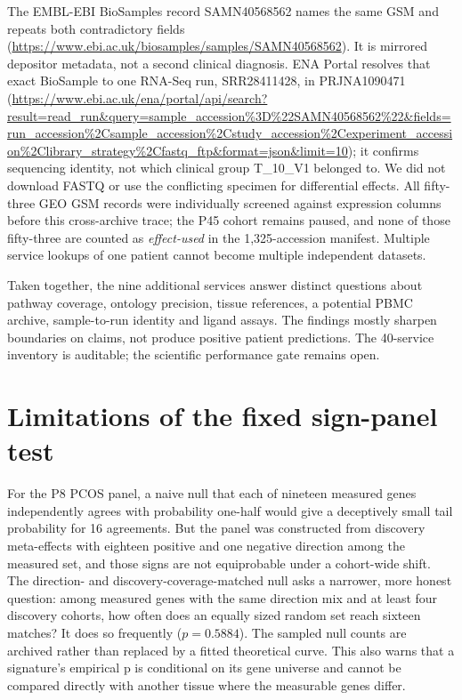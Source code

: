 \documentclass[11pt,a4paper]{article}
\begin{document}
The EMBL-EBI BioSamples record SAMN40568562 names the same GSM and repeats both contradictory fields (\url{https://www.ebi.ac.uk/biosamples/samples/SAMN40568562}). It is mirrored depositor metadata, not a second clinical diagnosis. ENA Portal resolves that exact BioSample to one RNA-Seq run, SRR28411428, in PRJNA1090471 (\url{https://www.ebi.ac.uk/ena/portal/api/search?result=read_run&query=sample_accession%3D%22SAMN40568562%22&fields=run_accession%2Csample_accession%2Cstudy_accession%2Cexperiment_accession%2Clibrary_strategy%2Cfastq_ftp&format=json&limit=10}); it confirms sequencing identity, not which clinical group T\_10\_V1 belonged to. We did not download FASTQ or use the conflicting specimen for differential effects. All fifty-three GEO GSM records were individually screened against expression columns before this cross-archive trace; the P45 cohort remains paused, and none of those fifty-three are counted as \emph{effect-used} in the 1,325-accession manifest. Multiple service lookups of one patient cannot become multiple independent datasets.

Taken together, the nine additional services answer distinct questions about pathway coverage, ontology precision, tissue references, a potential PBMC archive, sample-to-run identity and ligand assays. The findings mostly sharpen boundaries on claims, not produce positive patient predictions. The 40-service inventory is auditable; the scientific performance gate remains open.


\section{Limitations of the fixed sign-panel test}
For the P8 PCOS panel, a naive null that each of nineteen measured genes independently agrees with probability one-half would give a deceptively small tail probability for 16 agreements. But the panel was constructed from discovery meta-effects with eighteen positive and one negative direction among the measured set, and those signs are not equiprobable under a cohort-wide shift. The direction- and discovery-coverage-matched null asks a narrower, more honest question: among measured genes with the same direction mix and at least four discovery cohorts, how often does an equally sized random set reach sixteen matches? It does so frequently ($p=0.5884$). The sampled null counts are archived rather than replaced by a fitted theoretical curve. This also warns that a signature's empirical p is conditional on its gene universe and cannot be compared directly with another tissue where the measurable genes differ.
\end{document}
